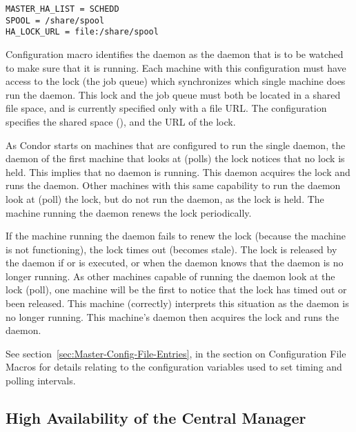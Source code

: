 \begin{verbatim}
MASTER_HA_LIST = SCHEDD
SPOOL = /share/spool
HA_LOCK_URL = file:/share/spool
\end{verbatim}

Configuration macro  identifies the 
 daemon as the daemon that is to be watched
to make sure that it is running.
Each machine with this configuration must have access to the
lock (the job queue) which synchronizes which single machine does run the
 daemon.
This lock and the job queue must both be located in a shared file space,
and is currently specified only with a file URL.
The configuration specifies the shared space
(),
and the URL of the lock.

As Condor starts on machines that are configured to run
the single  daemon, 
the  daemon of the
first machine that looks at (polls) the lock
notices that no lock is held.
This implies that no  daemon is running.
This  daemon acquires the lock
and runs the  daemon.
Other machines with this same capability to run the
 daemon look at (poll) the lock, 
but do not run the daemon, as the lock is held.
The machine running the  daemon renews the
lock periodically.

If the machine running the  daemon fails to renew
the lock (because the machine is not functioning),
the lock times out (becomes stale).
The lock is released by the  daemon
if  or  is
executed, or when the  daemon knows that the
 daemon is no longer running.
As other machines capable of running the  daemon
look at the lock (poll), one machine will be the first
to notice that the lock has timed out or been released.
This machine (correctly) interprets this situation as the
 daemon is no longer running.
This machine's  daemon then acquires the lock
and runs the  daemon.

See 
section~\ref{sec:Master-Config-File-Entries},
in the section on  Configuration File Macros
for details relating to the configuration variables
used to set timing and polling intervals.

\subsection{\label{sec:HA-negotiator} High Availability of the
Central Manager} 

